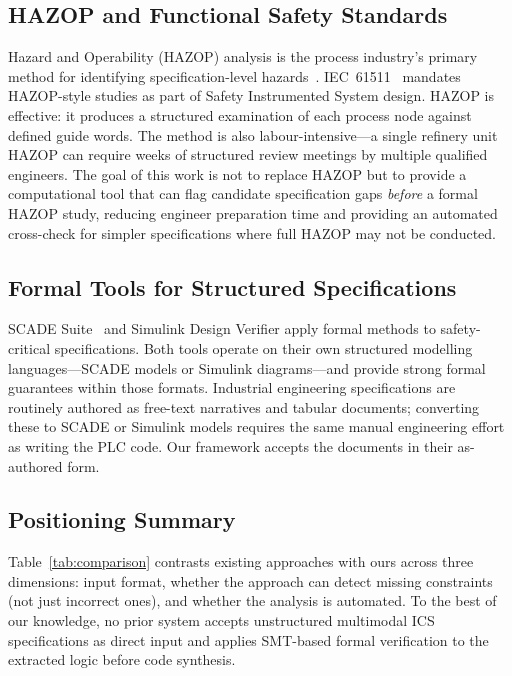 \documentclass[conference]{IEEEtran}
\begin{document}
\subsection{HAZOP and Functional Safety Standards}
Hazard and Operability (HAZOP) analysis is the process industry's
primary method for identifying specification-level hazards~\cite{leveson2011}.
IEC~61511~\cite{iec61511} mandates HAZOP-style studies as part of Safety
Instrumented System design. HAZOP is effective: it produces a structured
examination of each process node against defined guide words. The method
is also labour-intensive---a single refinery unit HAZOP can require weeks
of structured review meetings by multiple qualified engineers. The goal of
this work is not to replace HAZOP but to provide a computational tool that
can flag candidate specification gaps \emph{before} a formal HAZOP study,
reducing engineer preparation time and providing an automated cross-check
for simpler specifications where full HAZOP may not be conducted.

\subsection{Formal Tools for Structured Specifications}
SCADE Suite~\cite{scade} and Simulink Design Verifier apply formal methods
to safety-critical specifications. Both tools operate on their own structured
modelling languages---SCADE models or Simulink diagrams---and provide strong
formal guarantees within those formats. Industrial engineering specifications
are routinely authored as free-text narratives and tabular documents;
converting these to SCADE or Simulink models requires the same manual engineering
effort as writing the PLC code. Our framework accepts the documents in their
as-authored form.

\subsection{Positioning Summary}
Table~\ref{tab:comparison} contrasts existing approaches with ours across
three dimensions: input format, whether the approach can detect missing
constraints (not just incorrect ones), and whether the analysis is automated.
To the best of our knowledge, no prior system accepts unstructured multimodal
ICS specifications as direct input and applies SMT-based formal verification
to the extracted logic before code synthesis.
\end{document}
